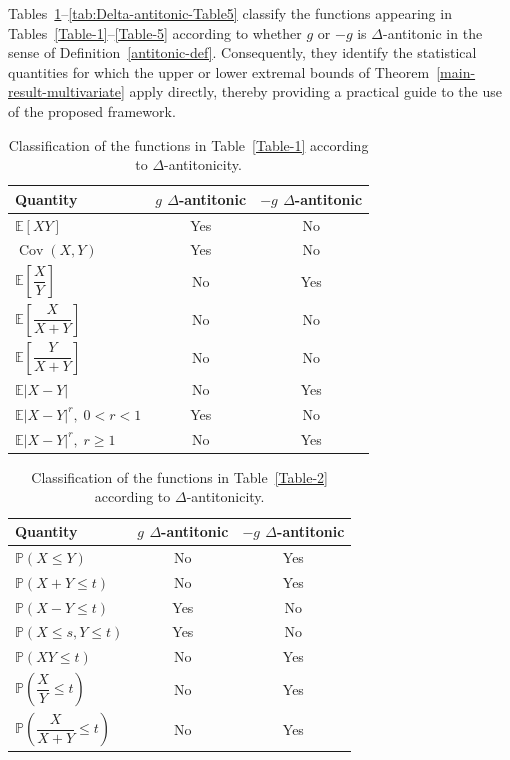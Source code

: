 \documentclass[12pt]{article}
\begin{document}
Tables~\ref{tab:Delta-antitonic}--\ref{tab:Delta-antitonic-Table5}
classify the functions appearing in Tables~\ref{Table-1}--\ref{Table-5}
according to whether $g$ or $-g$ is $\Delta$-antitonic in the sense of
Definition~\ref{antitonic-def}. Consequently, they identify the statistical
quantities for which the upper or lower extremal bounds of
Theorem~\ref{main-result-multivariate} apply directly, thereby providing a
practical guide to the use of the proposed framework.
%
\begin{table}[H]
	\centering
	\caption{Classification of the functions in Table~\ref{Table-1} according to $\Delta$-antitonicity.}
	\renewcommand{\arraystretch}{1.2}
	\begin{tabular}{lcc}
		\hline
		Quantity & $g$ $\Delta$-antitonic & $-g$ $\Delta$-antitonic\\
		\hline
		$\mathbb E[XY]$ & Yes & No\\
		$\operatorname{Cov}(X,Y)$ & Yes & No\\
		$\mathbb E\left[\dfrac{X}{Y}\right]$ & No & Yes\\
		$\mathbb E\!\left[\dfrac{X}{X+Y}\right]$ & No & No\\
		$\mathbb E\!\left[\dfrac{Y}{X+Y}\right]$ & No & No\\
		$\mathbb E|X-Y|$ & No & Yes\\
		$\mathbb E|X-Y|^r,\;0<r<1$ & Yes & No\\
		$\mathbb E|X-Y|^r,\;r\geqslant1$ & No & Yes\\
		\hline
	\end{tabular}
	\label{tab:Delta-antitonic}
\end{table}

\begin{table}[H]
	\centering
	\caption{Classification of the functions in Table~\ref{Table-2} according to $\Delta$-antitonicity.}
	\renewcommand{\arraystretch}{1.2}
	\begin{tabular}{lcc}
		\hline
		Quantity &
		$g$ $\Delta$-antitonic &
		$-g$ $\Delta$-antitonic
		\\
		\hline
		
		$\mathbb P(X\leqslant Y)$
		&
		No
		&
		Yes
		\\
		
		$\mathbb P(X+Y\leqslant t)$
		&
		No
		&
		Yes
		\\
		
		$\mathbb P(X-Y\leqslant t)$
		&
		Yes
		&
		No
		\\
		
		$\mathbb P(X\leqslant s,Y\leqslant t)$
		&
		Yes
		&
		No
		\\
		
		$\mathbb P(XY\leqslant t)$
		&
		No
		&
		Yes
		\\
		
		$\mathbb P\!\left(\dfrac{X}{Y}\leqslant t\right)$
		&
		No
		&
		Yes
		\\
		
		$\mathbb P\!\left(\dfrac{X}{X+Y}\leqslant t\right)$
		&
		No
		&
		Yes
		\\
		
		\hline
	\end{tabular}
	\label{tab:Delta-antitonic-Table2}
\end{table}
\end{document}
